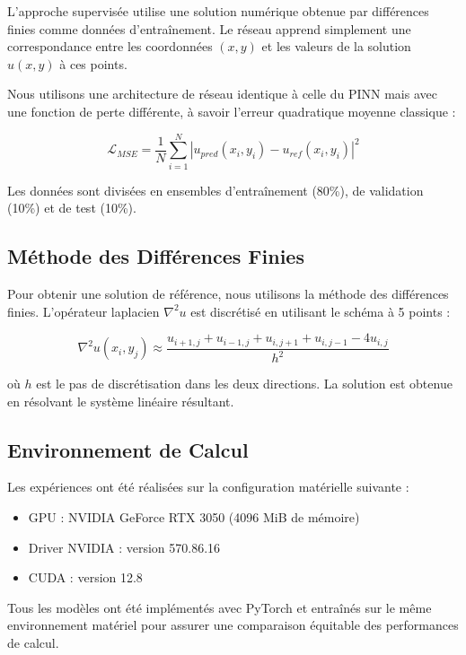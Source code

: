 \documentclass[11pt,a4paper]{article}
\begin{document}
L'approche supervisée utilise une solution numérique obtenue par différences finies comme données d'entraînement. Le réseau apprend simplement une correspondance entre les coordonnées $(x,y)$ et les valeurs de la solution $u(x,y)$ à ces points.

Nous utilisons une architecture de réseau identique à celle du PINN mais avec une fonction de perte différente, à savoir l'erreur quadratique moyenne classique :

\begin{equation}
\mathcal{L}_{MSE} = \frac{1}{N} \sum_{i=1}^{N} \left| u_{pred}(x_i, y_i) - u_{ref}(x_i, y_i) \right|^2
\end{equation}

Les données sont divisées en ensembles d'entraînement (80\%), de validation (10\%) et de test (10\%).

\subsection{Méthode des Différences Finies}

Pour obtenir une solution de référence, nous utilisons la méthode des différences finies. L'opérateur laplacien $\nabla^2 u$ est discrétisé en utilisant le schéma à 5 points :

\begin{equation}
\nabla^2 u(x_i, y_j) \approx \frac{u_{i+1,j} + u_{i-1,j} + u_{i,j+1} + u_{i,j-1} - 4u_{i,j}}{h^2}
\end{equation}

où $h$ est le pas de discrétisation dans les deux directions. La solution est obtenue en résolvant le système linéaire résultant.

\subsection{Environnement de Calcul}

Les expériences ont été réalisées sur la configuration matérielle suivante :
\begin{itemize}
    \item GPU : NVIDIA GeForce RTX 3050 (4096 MiB de mémoire)
    \item Driver NVIDIA : version 570.86.16
    \item CUDA : version 12.8
\end{itemize}

Tous les modèles ont été implémentés avec PyTorch et entraînés sur le même environnement matériel pour assurer une comparaison équitable des performances de calcul.
\end{document}

